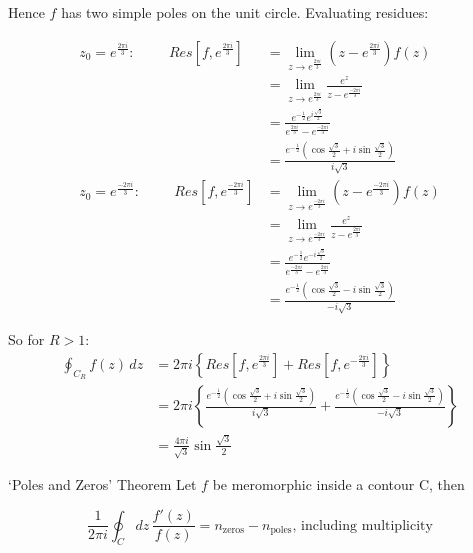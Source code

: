\documentclass{../../physics_notes}
\begin{document}
\begin{enumerate}[label=\alph*)]
{Hence $f$ has two simple poles on the unit circle. Evaluating residues:

\begin{align*}
z_0 = e^\frac{2\pi i }{3}: \hspace{1cm} Res[f,e^\frac{2\pi i}{3}] &= \lim_{z\to e^\frac{2\pi i}{3}} (z - e^\frac{2\pi i}{3})f(z) \\ 
&= \lim_{z\to e^\frac{2\pi i}{3}} \frac{e^z}{z - e^\frac{-2\pi i}{3}} \\ 
&= \frac{e^{-\frac{1}{2}} e^{i\frac{\sqrt{3}}{2}}}{e^\frac{2\pi i}{3} - e^\frac{-2\pi i}{3}} \\
&= \frac{e^{-\frac{1}{2}} (\cos{\frac{\sqrt{3}}{2}} + i\sin{\frac{\sqrt{3}}{2}}) }{i\sqrt{3}} \\
z_0 = e^\frac{-2\pi i}{3}: \hspace{1cm} Res[f,e^\frac{-2\pi i}{3}] &= \lim_{z\to e^\frac{-2\pi i}{3}} (z - e^\frac{-2\pi i}{3})f(z) \\ 
&= \lim_{z\to e^\frac{-2\pi i}{3}} \frac{e^z}{z - e^\frac{2\pi i}{3}} \\ 
&= \frac{e^{-\frac{1}{2}} e^{-i\frac{\sqrt{3}}{2}}}{e^\frac{-2\pi i}{3} - e^\frac{2\pi i}{3}} \\
&= \frac{e^{-\frac{1}{2}} (\cos{\frac{\sqrt{3}}{2}} - i\sin{\frac{\sqrt{3}}{2}}) }{-i\sqrt{3}}
\end{align*}

So for $R>1$: \begin{align*} 
\oint_{C_R} f(z)\, dz &= 2\pi i \left\{Res[f,e^\frac{2\pi i }{3}] + Res[f, e^{-\frac{2\pi i}{3}}]\right\} \\
&= 2\pi i \left\{ \frac{e^{-\frac{1}{2}} (\cos{\frac{\sqrt{3}}{2}} + i\sin{\frac{\sqrt{3}}{2}}) }{i\sqrt{3}} + \frac{e^{-\frac{1}{2}} (\cos{\frac{\sqrt{3}}{2}} - i\sin{\frac{\sqrt{3}}{2}}) }{-i\sqrt{3}} \right\} \\
&= \frac{4\pi i}{\sqrt{3}} \sin{\frac{\sqrt{3}}{2}}
\end{align*}
}
\end{enumerate}

\begin{theorem}{`Poles and Zeros' Theorem}
Let $f$ be meromorphic inside a contour C, then

\begin{equation}\label{thm:poles_and_zeros}
\frac{1}{2\pi i} \oint_C dz \, \frac{f'(z)}{f(z)} = n_\text{zeros} - n_\text{poles} \text{, including multiplicity}
\end{equation}

\end{theorem}
\end{document}
